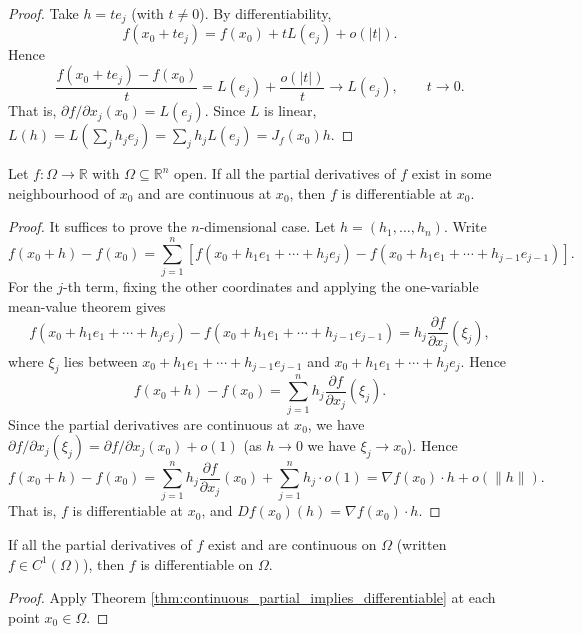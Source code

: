 \begin{proof}
Take $h = t e_j$ (with $t \neq 0$). By differentiability,
\[
f(x_0 + t e_j) = f(x_0) + t L(e_j) + o(|t|).
\]
Hence
\[
\frac{f(x_0 + t e_j) - f(x_0)}{t} = L(e_j) + \frac{o(|t|)}{t} \to L(e_j), \qquad t \to 0.
\]
That is, $\partial f/\partial x_j(x_0) = L(e_j)$. Since $L$ is linear, $L(h) = L(\sum_j h_j e_j) = \sum_j h_j L(e_j) = J_f(x_0) h$.
\end{proof}

\begin{theorem}\label{thm:continuous_partial_implies_differentiable}
Let $f: \Omega \to \mathbb{R}$ with $\Omega \subseteq \mathbb{R}^n$ open. If all the partial derivatives of $f$ exist in some neighbourhood of $x_0$ and are continuous at $x_0$, then $f$ is differentiable at $x_0$.
\end{theorem}

\begin{proof}
It suffices to prove the $n$-dimensional case. Let $h = (h_1, \dots, h_n)$. Write
\[
f(x_0 + h) - f(x_0) = \sum_{j=1}^{n} [f(x_0 + h_1 e_1 + \cdots + h_j e_j) - f(x_0 + h_1 e_1 + \cdots + h_{j-1} e_{j-1})].
\]
For the $j$-th term, fixing the other coordinates and applying the one-variable mean-value theorem gives
\[
f(x_0 + h_1 e_1 + \cdots + h_j e_j) - f(x_0 + h_1 e_1 + \cdots + h_{j-1} e_{j-1}) = h_j \frac{\partial f}{\partial x_j}(\xi_j),
\]
where $\xi_j$ lies between $x_0 + h_1 e_1 + \cdots + h_{j-1} e_{j-1}$ and $x_0 + h_1 e_1 + \cdots + h_j e_j$. Hence
\[
f(x_0 + h) - f(x_0) = \sum_{j=1}^{n} h_j \frac{\partial f}{\partial x_j}(\xi_j).
\]
Since the partial derivatives are continuous at $x_0$, we have $\partial f/\partial x_j(\xi_j) = \partial f/\partial x_j(x_0) + o(1)$ (as $h \to 0$ we have $\xi_j \to x_0$). Hence
\[
f(x_0 + h) - f(x_0) = \sum_{j=1}^{n} h_j \frac{\partial f}{\partial x_j}(x_0) + \sum_{j=1}^{n} h_j \cdot o(1) = \nabla f(x_0) \cdot h + o(\|h\|).
\]
That is, $f$ is differentiable at $x_0$, and $Df(x_0)(h) = \nabla f(x_0) \cdot h$.
\end{proof}

\begin{corollary}\label{cor:c1_differentiable}
If all the partial derivatives of $f$ exist and are continuous on $\Omega$ (written $f \in C^1(\Omega)$), then $f$ is differentiable on $\Omega$.
\end{corollary}

\begin{proof}
Apply Theorem \ref{thm:continuous_partial_implies_differentiable} at each point $x_0 \in \Omega$.
\end{proof}

